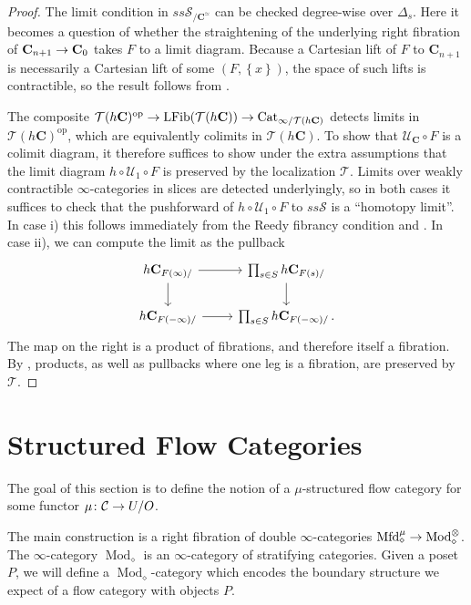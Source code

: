 \documentclass[10pt]{amsart}
\numberwithin{equation}{section}
\theoremstyle{definition}
\DeclareMathOperator{\Mod}{Mod}
\DeclareMathOperator{\op}{op}
\DeclareMathOperator{\LFib}{LFib}
\newcommand{\Cat}{\mathrm{Cat}\vphantom{t}}
\newcommand{\Mfd}{\mathrm{Mfd}\vphantom{d}}
\newcommand{\Simp}{\mathbb{\Delta}}
\newcommand{\cC}{\mathcal{C}}
\newcommand{\cS}{\mathcal{S}}
\newcommand{\cT}{\mathcal{T}}
\newcommand{\cU}{\mathcal{U}}
\newcommand{\bfC}{\mathbf{C}}
\renewcommand{\to}{\mathchoice{\longrightarrow}{\rightarrow}{}{}}
\begin{document}
	\begin{proof}
		The limit condition in $ss\cS_{/\bfC^{\simeq}}$ can be checked degree-wise over $\Simp_{s}$.
    Here it becomes a question of whether the straightening of the underlying right fibration of $\bfC_{n+1} \to \bfC_{0}$ takes $F$ to a limit diagram.
    Because a Cartesian lift of $F$ to $\bfC_{n+1}$ is necessarily a Cartesian lift of some $(F, \left\{ x\right\})$, the space of such lifts is contractible, so the result follows from .

		The composite $\cT(h\bfC)^{\op} \to \LFib(\cT(h\bfC)) \to \Cat_{\infty/\cT(h\bfC)}$ detects limits in $\cT(h\bfC)^{\op}$, which are equivalently colimits in $\cT(h\bfC)$.
    To show that $\cU_{\bfC}\circ F$ is a colimit diagram, it therefore suffices to show under the extra assumptions that the limit diagram $h\circ \cU_{1}\circ F$ is preserved by the localization $\cT$.
    Limits over weakly contractible $\infty$-categories in slices are detected underlyingly, so in both cases it suffices to check that the pushforward of $h\circ \cU_{1}\circ F$ to $ss\cS$ is a ``homotopy limit''.
    In case i) this follows immediately from the Reedy fibrancy condition and .
    In case ii), we can compute the limit as the pullback
		\begin{equation*}
			\begin{tikzcd}
				h\bfC_{F(\infty)/} \arrow[r] \arrow[d]      &   \prod_{s\in S} h\bfC_{F(s)/}  \arrow[d] \\
				h\bfC_{F(-\infty)/}  \arrow[r]               &   \prod_{s\in S} h\bfC_{F(-\infty)/} \,.
			\end{tikzcd}
		\end{equation*}
		The map on the right is a product of fibrations, and therefore itself a fibration.
    By , products, as well as pullbacks where one leg is a fibration, are preserved by $\cT$.
	\end{proof}


\section{Structured Flow Categories}\label{sec:structured_flow_categories}

The goal of this section is to define the notion of a $\mu$-structured flow category for some functor $\mu\colon \cC \to U/O$.

The main construction is a right fibration of double $\infty$-categories $\Mfd^{\mu}_{\diamond} \to \Mod_{\diamond}^{\otimes}$.
The $\infty$-category $\Mod_{\diamond}$ is an $\infty$-category of stratifying categories.
Given a poset $P$, we will define a $\Mod_{\diamond}$-category which encodes the boundary structure we expect of a flow category with objects $P$.
\end{document}
